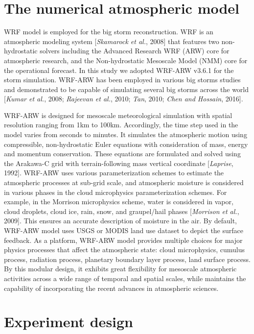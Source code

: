 \section{The numerical atmospheric model}

WRF model is employed for the big storm reconstruction. WRF is an atmospheric modeling system [\textit{Skamarock et al.}, 2008] that features two non-hydrostatic solvers including the Advanced Research WRF (ARW) core for atmospheric research, and the Non-hydrostatic Mesoscale Model (NMM) core for the operational forecast. In this study we adopted WRF-ARW v3.6.1 for the storm simulation. WRF-ARW has been employed in various big storms studies and demonstrated to be capable of simulating several big storms across the world [\textit{Kumar et al.}, 2008; \textit{Rajeevan et al.}, 2010; \textit{Tan}, 2010; \textit{Chen and Hossain}, 2016].

WRF-ARW is designed for mesoscale meteorological simulation with spatial resolution ranging from 1km to 100km. Accordingly, the time step used in the model varies from seconds to minutes. It simulates the atmospheric motion using compressible, non-hydrostatic Euler equations with consideration of mass, energy and momentum conservation. These equations are formulated and solved using the Arakawa-C grid with terrain-following mass vertical coordinate [\textit{Laprise}, 1992]. WRF-ARW uses various parameterization schemes to estimate the atmospheric processes at sub-grid scale, and atmospheric moisture is considered in various phases in the cloud microphysics parameterization schemes. For example, in the Morrison microphysics scheme, water is considered in vapor, cloud droplets, cloud ice, rain, snow, and graupel/hail phases [\textit{Morrison et al.}, 2009]. This ensures an accurate description of moisture in the air. By default, WRF-ARW model uses USGS or MODIS land use dataset to depict the surface feedback. As a platform, WRF-ARW model provides multiple choices for major physics processes that affect the atmospheric state: cloud microphysics, cumulus process, radiation process, planetary boundary layer process, land surface process. By this modular design, it exhibits great flexibility for mesoscale atmospheric activities across a wide range of temporal and spatial scales, while maintains the capability of incorporating the recent advances in atmospheric sciences.

\section{Experiment design}

